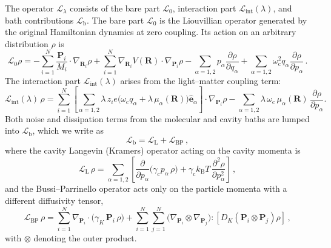The operator $\mathcal{L}_\lambda$ consists of the bare part $\mathcal{L}_0$, interaction part $\mathcal{L}_\mathrm{int}(\lambda)$, and bath contributions $\mathcal{L}_\mathrm{b}$. The bare part $\mathcal{L}_0$ is the Liouvillian operator generated by the original Hamiltonian dynamics at zero coupling. Its action on an arbitrary distribution $\rho$ is
\begin{equation}
\mathcal L_0 \rho
= - \sum_{i=1}^N \frac{\bm P_i}{M_i} \cdot\nabla_{\bm R_i} \rho
  + \sum_{i=1}^N \nabla_{\bm R_i} V(\bm R) \cdot \nabla_{\bm P_i} \rho
  -\sum_{\alpha=1,2} p_\alpha \frac{\partial \rho}{\partial q_\alpha}
  + \sum_{\alpha=1,2} \omega_\mathrm{c}^2 q_\alpha \frac{\partial \rho}{\partial p_\alpha} \,.
\end{equation}
The interaction part $\mathcal{L}_\mathrm{int}(\lambda)$ arises from the light--matter coupling term:
\begin{equation}
\mathcal L_{\mathrm{int}}(\lambda)\,\rho
= \sum_{i=1}^N  
\left[
   \sum_{\alpha=1,2} \lambda\,z_i e
   \bigl(\omega_\mathrm{c} q_\alpha + \lambda\,\mu_\alpha(\bm R)\bigr)
   \hat{\bm e}_\alpha
\right] \cdot \nabla_{\bm P_i} \rho
 - \sum_{\alpha=1,2} \lambda\,\omega_\mathrm{c}\,\mu_\alpha(\bm R)\,
   \frac{\partial \rho}{\partial p_\alpha}.
\end{equation}
Both noise and dissipation terms from the molecular and cavity baths are lumped into $\mathcal{L}_\mathrm{b}$, which we write as
\begin{equation}
\mathcal L_\mathrm{b} = \mathcal L_\mathrm{L} + \mathcal L_{\mathrm{BP}} \,,
\end{equation}
where the cavity Langevin (Kramers) operator\cite{kramers1940brownian,risken1996fokker} acting on the cavity momenta is
\begin{equation}
\mathcal L_\mathrm{L}\,\rho
= \sum_{\alpha=1,2} \left[
\frac{\partial}{\partial p_\alpha}\bigl(\gamma_\mathrm{c} p_\alpha\,\rho\bigr)
+ \gamma_\mathrm{c} k_\mathrm{B} T\,
  \frac{\partial^2 \rho}{\partial p_\alpha^2}
\right] \,,
\end{equation}
and the Bussi--Parrinello operator acts only on the particle momenta with a different diffusivity tensor,
\begin{equation}
\mathcal L_{\mathrm{BP}}\,\rho
= \sum_{i=1}^N \nabla_{\bm P_i}\!\cdot\!\bigl(\gamma_K\,\bm P_i\,\rho\bigr)
  + \sum_{i=1}^N \sum_{j=1}^N \bigl(\nabla_{\bm P_i}\otimes\nabla_{\bm P_j}\bigr)
    : \left[ D_K \left(\bm P_i\otimes\bm P_j\right) \rho \right]\,,
\label{eq:LBP_compact}
\end{equation}
with $\otimes$ denoting the outer product.

